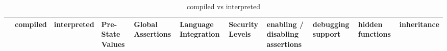 \documentclass{sig-alternate}
\begin{document}
\begin{table*}[]
\centering
\caption{compiled vs interpreted}
\label{my-label}
\begin{tabular}{|l|l|l|l|l|l|l|l|l|l|l|}
\hline
        & compiled                                                                                                                                                                                                                                                                                                                                           & interpreted                                                                                                                 & Pre-State Values & Global Assertions & Language Integration                                                                                                                                                                                                                                                   & Security Levels                                                               & enabling / disabling assertions                                                                                                                                                         & debugging support                                                                           & hidden functions & inheritance                                                                                                                   \\ \hline

\end{tabular}
\end{table*}
\end{document}
